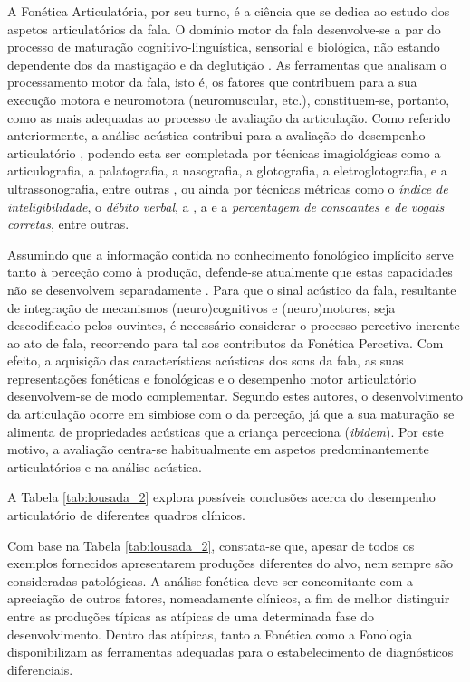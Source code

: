 \documentclass[output=paper]{LSP/langsci}
\begin{document}
\largerpage A Fonética Articulatória, por seu turno, é a ciência que se dedica ao estudo dos aspetos articulatórios da fala. O domínio motor da fala desenvolve-se a par do processo de maturação cognitivo-linguística, sensorial e biológica, não estando dependente dos da mastigação e da deglutição \citep{kent2000}. As ferramentas que analisam o processamento motor da fala, isto é, os fatores que contribuem para a sua execução motora e neuromotora (neuromuscular, etc.), constituem-se, portanto, como as mais adequadas ao processo de avaliação da articulação. Como referido anteriormente, a análise acústica contribui para a avaliação do desempenho articulatório \citep{rielysmith2003}, podendo esta ser completada por técnicas imagiológicas como a articulografia, a palatografia, a nasografia, a glotografia, a eletroglotografia, e a ultrassonografia, entre outras \citep{berti2013,llisterri2014}, ou ainda por técnicas métricas como o \textit{índice de inteligibilidade}, o \textit{débito verbal}, a \textit{}, a \textit{} e a \textit{percentagem de consoantes e de vogais corretas}, entre outras.

Assumindo que a informação contida no conhecimento fonológico implícito serve tanto à perceção como à produção, defende-se atualmente que estas capacidades não se desenvolvem separadamente \citep{kent2000,peperkampdupoux2002,smith2006,smith2010}. Para que o sinal acústico da fala, resultante de integração de mecanismos (neuro)cognitivos e (neuro)motores, seja descodificado pelos ouvintes, é necessário considerar o processo percetivo inerente ao ato de fala, recorrendo para tal aos contributos da Fonética Percetiva.  Com efeito, a aquisição das características acústicas dos sons da fala, as suas representações fonéticas e fonológicas e o desempenho motor articulatório desenvolvem-se de modo complementar. Segundo estes autores, o desenvolvimento da articulação ocorre em simbiose com o da perceção, já que a sua maturação se alimenta de propriedades acústicas que a criança perceciona (\textit{ibidem}). Por este motivo, a avaliação centra-se habitualmente em aspetos predominantemente articulatórios e na análise acústica. 

A Tabela \ref{tab:lousada_2} explora possíveis conclusões acerca do desempenho articulatório de diferentes quadros clínicos.

Com base na Tabela \ref{tab:lousada_2}, constata-se que, apesar de todos os exemplos fornecidos apresentarem produções diferentes do alvo, nem sempre são consideradas patológicas. A análise fonética deve ser concomitante com a apreciação de outros fatores, nomeadamente clínicos, a fim de melhor distinguir entre as produções típicas as atípicas de uma determinada fase do desenvolvimento. Dentro das atípicas, tanto a Fonética como a Fonologia disponibilizam as ferramentas adequadas para o estabelecimento de diagnósticos diferenciais.
\end{document}
